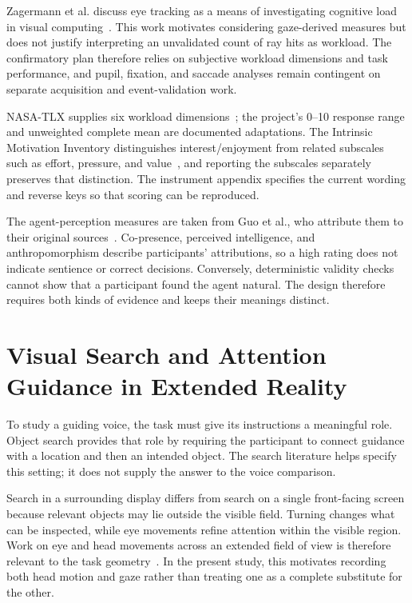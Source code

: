 Zagermann et al. discuss eye tracking as a means of investigating cognitive load in visual computing~\cite{zagermann2016workload}. This work motivates considering gaze-derived measures but does not justify interpreting an unvalidated count of ray hits as workload. The confirmatory plan therefore relies on subjective workload dimensions and task performance, and pupil, fixation, and saccade analyses remain contingent on separate acquisition and event-validation work.

NASA-TLX supplies six workload dimensions~\cite{hart1988nasatlx}; the project's 0--10 response range and unweighted complete mean are documented adaptations. The Intrinsic Motivation Inventory distinguishes interest/enjoyment from related subscales such as effort, pressure, and value~\cite{ryan1982control,mcauley1989imi,csdtIMI}, and reporting the subscales separately preserves that distinction. The instrument appendix specifies the current wording and reverse keys so that scoring can be reproduced.

The agent-perception measures are taken from Guo et al., who attribute them to their original sources~\cite{guo2024doppelganger,biocca2001networked,moussawi2019perception}. Co-presence, perceived intelligence, and anthropomorphism describe participants' attributions, so a high rating does not indicate sentience or correct decisions. Conversely, deterministic validity checks cannot show that a participant found the agent natural. The design therefore requires both kinds of evidence and keeps their meanings distinct.


\section{Visual Search and Attention Guidance in Extended Reality}
To study a guiding voice, the task must give its instructions a meaningful role. Object search provides that role by requiring the participant to connect guidance with a location and then an intended object. The search literature helps specify this setting; it does not supply the answer to the voice comparison.

Search in a surrounding display differs from search on a single front-facing screen because relevant objects may lie outside the visible field. Turning changes what can be inspected, while eye movements refine attention within the visible region. Work on eye and head movements across an extended field of view is therefore relevant to the task geometry~\cite{stein2024eyehead}. In the present study, this motivates recording both head motion and gaze rather than treating one as a complete substitute for the other.

